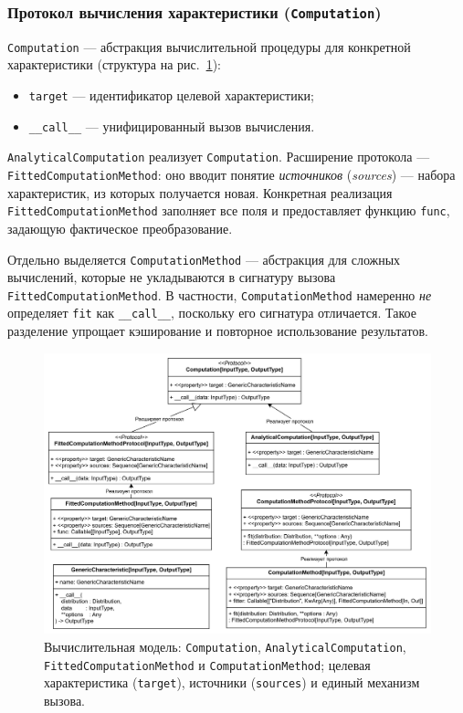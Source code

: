 \subsubsection{Протокол вычисления характеристики (\texttt{Computation})}

\texttt{Computation} — абстракция вычислительной процедуры для конкретной характеристики (структура на рис.~\ref{fig:uml-computation}):
\begin{itemize}
  \item \texttt{target} — идентификатор целевой характеристики;
  \item \texttt{\_\_call\_\_} — унифицированный вызов вычисления.
\end{itemize}
\texttt{AnalyticalComputation} реализует \texttt{Computation}. Расширение протокола — \texttt{FittedComputationMethod}: оно вводит понятие \emph{источников} (\emph{sources}) — набора характеристик, из которых получается новая. Конкретная реализация \texttt{FittedComputationMethod} заполняет все поля и предоставляет функцию \texttt{func}, задающую фактическое преобразование.

Отдельно выделяется \texttt{ComputationMethod} — абстракция для сложных вычислений, которые не укладываются в сигнатуру вызова \texttt{FittedComputationMethod}. В частности, \texttt{ComputationMethod} намеренно \emph{не} определяет \texttt{fit} как \texttt{\_\_call\_\_}, поскольку его сигнатура отличается. Такое разделение упрощает кэширование и повторное использование результатов.

\begin{figure}[htbp]
  \centering
  \includegraphics[width=\linewidth]{assets/images/Computation.png}
  \caption{Вычислительная модель: \texttt{Computation}, \texttt{AnalyticalComputation},
  \texttt{FittedComputationMethod} и \texttt{ComputationMethod}; целевая характеристика (\texttt{target}),
  источники (\texttt{sources}) и единый механизм вызова.}
  \label{fig:uml-computation}
\end{figure}


